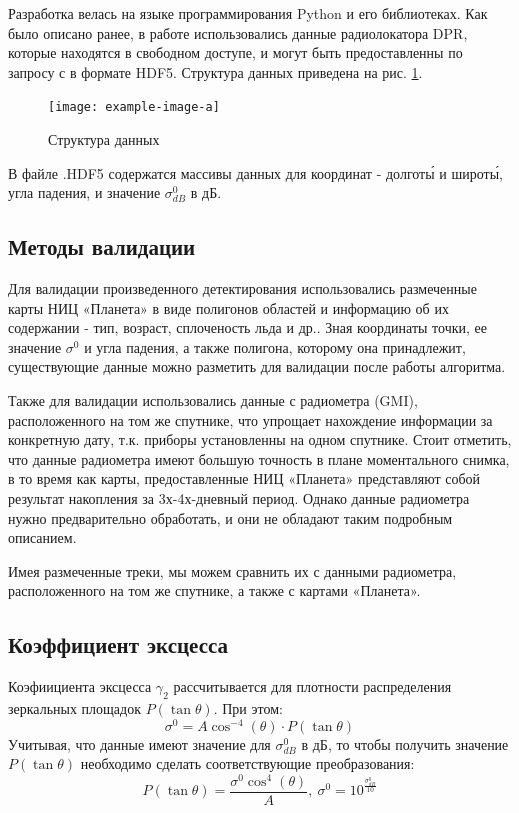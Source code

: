  

Разработка велась на языке программирования Python и его библиотеках. Как было описано ранее, в работе использовались
данные радиолокатора DPR, которые находятся в свободном доступе, и могут
быть предоставленны по запросу с \cite{data} в формате HDF5. Структура данных приведена на рис. \ref{fig:5}.

\begin{figure}[h!]
  \centering
  \texttt{[image: example-image-a]}
  \caption{Структура данных}
  \label{fig:5}
\end{figure}

В файле .HDF5 содержатся массивы данных для координат - долгот\'{ы} и широт\'{ы}, угла падения, и значение $\sigma^0_{dB}$ в
дБ. 

\subsection{Методы валидации}

Для валидации произведенного детектирования использовались размеченные карты НИЦ «Планета» в виде полигонов областей и информацию об их содержании
- тип, возраст, сплоченость льда и др.. Зная координаты точки, ее значение $\sigma^0$ и угла падения, а также полигона,
которому она принадлежит, существующие данные можно разметить для валидации после работы алгоритма. 

Также для валидации использовались данные с радиометра (GMI), расположенного на том же спутнике, что упрощает нахождение
информации за конкретную дату, т.к. приборы установленны на одном спутнике. Стоит отметить, что данные радиометра имеют
большую точность в плане моментального снимка, в то время как карты, предоставленные НИЦ «Планета» представляют собой
результат накопления за 3х-4х-дневный период. Однако данные радиометра нужно предварительно обработать, и они не
обладают таким подробным описанием.

Имея размеченные треки, мы можем сравнить их с данными радиометра, расположенного на том же спутнике, а также с
картами «Планета».


\subsection{Коэффициент эксцесса}

Коэфиициента эксцесса $\gamma_2$ рассчитывается для плотности распределения зеркальных площадок $P(\tan \theta)$. При этом: 
\begin{equation}
  \sigma^0 = A \cos^{-4}(\theta) \cdot P(\tan \theta)
  \label{eq:8}
\end{equation}
Учитывая, что данные имеют значение для $\sigma^0_{dB}$ в дБ, то чтобы получить значение $P(\tan \theta)$ необходимо сделать
соответствующие преобразования:
\begin{equation}
  P(\tan \theta) =  \frac{\sigma^0 \cos^4(\theta)}{A},~ \sigma^0 = 10^{\frac{\sigma^0_{dB}}{10}}
  \label{eq:9}
\end{equation}

